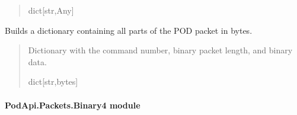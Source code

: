 \documentclass[letterpaper,10pt,english]{sphinxmanual}
\begin{document}
\begin{fulllineitems}
\begin{fulllineitems}
\begin{quote}
\begin{description}
\sphinxAtStartPar
dict{[}str,Any{]}

\end{description}\end{quote}

\end{fulllineitems}


\begin{fulllineitems}
\label{\detokenize{PodApi.Packets:PodApi.Packets.Binary.PacketBinary.UnpackAll}}
\pysigstartsignatures
{}
\pysigstopsignatures
\sphinxAtStartPar
Builds a dictionary containing all parts of the POD packet in bytes.
\begin{quote}\begin{description}
\sphinxAtStartPar
Dictionary with the command number, binary packet length,                 and binary data.

\sphinxAtStartPar
dict{[}str,bytes{]}

\end{description}\end{quote}

\end{fulllineitems}


\end{fulllineitems}



\paragraph{PodApi.Packets.Binary4 module}
\label{\detokenize{PodApi.Packets:module-PodApi.Packets.Binary4}}\label{\detokenize{PodApi.Packets:podapi-packets-binary4-module}}
\end{document}
